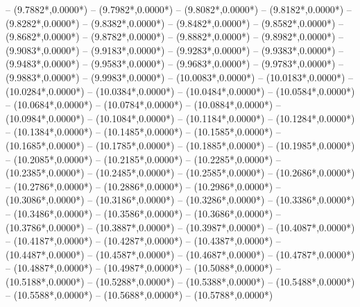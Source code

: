 {	-- ({9.7882*\dx},{0.0000*\dy})
	-- ({9.7982*\dx},{0.0000*\dy})
	-- ({9.8082*\dx},{0.0000*\dy})
	-- ({9.8182*\dx},{0.0000*\dy})
	-- ({9.8282*\dx},{0.0000*\dy})
	-- ({9.8382*\dx},{0.0000*\dy})
	-- ({9.8482*\dx},{0.0000*\dy})
	-- ({9.8582*\dx},{0.0000*\dy})
	-- ({9.8682*\dx},{0.0000*\dy})
	-- ({9.8782*\dx},{0.0000*\dy})
	-- ({9.8882*\dx},{0.0000*\dy})
	-- ({9.8982*\dx},{0.0000*\dy})
	-- ({9.9083*\dx},{0.0000*\dy})
	-- ({9.9183*\dx},{0.0000*\dy})
	-- ({9.9283*\dx},{0.0000*\dy})
	-- ({9.9383*\dx},{0.0000*\dy})
	-- ({9.9483*\dx},{0.0000*\dy})
	-- ({9.9583*\dx},{0.0000*\dy})
	-- ({9.9683*\dx},{0.0000*\dy})
	-- ({9.9783*\dx},{0.0000*\dy})
	-- ({9.9883*\dx},{0.0000*\dy})
	-- ({9.9983*\dx},{0.0000*\dy})
	-- ({10.0083*\dx},{0.0000*\dy})
	-- ({10.0183*\dx},{0.0000*\dy})
	-- ({10.0284*\dx},{0.0000*\dy})
	-- ({10.0384*\dx},{0.0000*\dy})
	-- ({10.0484*\dx},{0.0000*\dy})
	-- ({10.0584*\dx},{0.0000*\dy})
	-- ({10.0684*\dx},{0.0000*\dy})
	-- ({10.0784*\dx},{0.0000*\dy})
	-- ({10.0884*\dx},{0.0000*\dy})
	-- ({10.0984*\dx},{0.0000*\dy})
	-- ({10.1084*\dx},{0.0000*\dy})
	-- ({10.1184*\dx},{0.0000*\dy})
	-- ({10.1284*\dx},{0.0000*\dy})
	-- ({10.1384*\dx},{0.0000*\dy})
	-- ({10.1485*\dx},{0.0000*\dy})
	-- ({10.1585*\dx},{0.0000*\dy})
	-- ({10.1685*\dx},{0.0000*\dy})
	-- ({10.1785*\dx},{0.0000*\dy})
	-- ({10.1885*\dx},{0.0000*\dy})
	-- ({10.1985*\dx},{0.0000*\dy})
	-- ({10.2085*\dx},{0.0000*\dy})
	-- ({10.2185*\dx},{0.0000*\dy})
	-- ({10.2285*\dx},{0.0000*\dy})
	-- ({10.2385*\dx},{0.0000*\dy})
	-- ({10.2485*\dx},{0.0000*\dy})
	-- ({10.2585*\dx},{0.0000*\dy})
	-- ({10.2686*\dx},{0.0000*\dy})
	-- ({10.2786*\dx},{0.0000*\dy})
	-- ({10.2886*\dx},{0.0000*\dy})
	-- ({10.2986*\dx},{0.0000*\dy})
	-- ({10.3086*\dx},{0.0000*\dy})
	-- ({10.3186*\dx},{0.0000*\dy})
	-- ({10.3286*\dx},{0.0000*\dy})
	-- ({10.3386*\dx},{0.0000*\dy})
	-- ({10.3486*\dx},{0.0000*\dy})
	-- ({10.3586*\dx},{0.0000*\dy})
	-- ({10.3686*\dx},{0.0000*\dy})
	-- ({10.3786*\dx},{0.0000*\dy})
	-- ({10.3887*\dx},{0.0000*\dy})
	-- ({10.3987*\dx},{0.0000*\dy})
	-- ({10.4087*\dx},{0.0000*\dy})
	-- ({10.4187*\dx},{0.0000*\dy})
	-- ({10.4287*\dx},{0.0000*\dy})
	-- ({10.4387*\dx},{0.0000*\dy})
	-- ({10.4487*\dx},{0.0000*\dy})
	-- ({10.4587*\dx},{0.0000*\dy})
	-- ({10.4687*\dx},{0.0000*\dy})
	-- ({10.4787*\dx},{0.0000*\dy})
	-- ({10.4887*\dx},{0.0000*\dy})
	-- ({10.4987*\dx},{0.0000*\dy})
	-- ({10.5088*\dx},{0.0000*\dy})
	-- ({10.5188*\dx},{0.0000*\dy})
	-- ({10.5288*\dx},{0.0000*\dy})
	-- ({10.5388*\dx},{0.0000*\dy})
	-- ({10.5488*\dx},{0.0000*\dy})
	-- ({10.5588*\dx},{0.0000*\dy})
	-- ({10.5688*\dx},{0.0000*\dy})
	-- ({10.5788*\dx},{0.0000*\dy})
}
